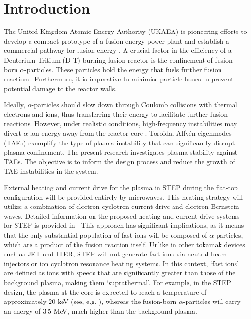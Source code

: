 \documentclass[10pt, a4paper, twoside]{article}
\begin{document}
\section{Introduction}
\label{sec:introduction}

The United Kingdom Atomic Energy Authority (UKAEA) is pioneering efforts to develop a compact prototype of a fusion energy power plant and establish a commercial pathway for fusion energy \cite{nuttall2020, meyer2023}. A crucial factor in the efficiency of a Deuterium-Tritium (D-T) burning fusion reactor is the confinement of fusion-born $\alpha$-particles. These particles hold the energy that fuels further fusion reactions. Furthermore, it is imperative to minimise particle losses to prevent potential damage to the reactor walls.

Ideally, $\alpha$-particles should slow down through Coulomb collisions with thermal electrons and ions, thus transferring their energy to facilitate further fusion reactions. However, under realistic conditions, high-frequency instabilities may divert $\alpha$-ion energy away from the reactor core \cite{belova2015}. Toroidal Alfv\'en eigenmodes (TAEs) exemplify the type of plasma instability that can significantly disrupt plasma confinement. The present research investigates plasma stability against TAEs. The objective is to inform the design process and reduce the growth of TAE instabilities in the system.

External heating and current drive for the plasma in STEP during the flat-top configuration will be provided entirely by microwaves. This heating strategy will utilize a combination of electron cyclotron current drive and electron Bernstein waves. Detailed information on the proposed heating and current drive systems for STEP is provided in \cite{freethy2023}.
This approach has significant implications, as it means that the only substantial population of fast ions will be composed of $\alpha$-particles, which are a product of the fusion reaction itself. Unlike in other tokamak devices such as JET and ITER, STEP will not generate fast ions via neutral beam injectors or ion cyclotron resonance heating systems.
In this context, `fast ions' are defined as ions with speeds that are significantly greater than those of the background plasma, making them `suprathermal'. For example, in the STEP design, the plasma at the core is expected to reach a temperature of approximately 20 keV (see, e.g. \cite{meyer2023,mitchell2023}), whereas the fusion-born $\alpha$-particles will carry an energy of 3.5 MeV, much higher than the background plasma.
\end{document}
